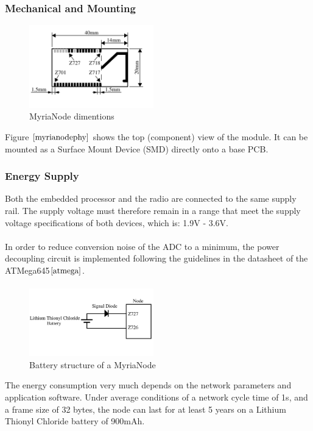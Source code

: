 \documentclass[a4paper,10pt]{report}
\begin{document}
\subsubsection{Mechanical and Mounting}
\begin{figure}
  \begin{center}
    \includegraphics[width=0.48\textwidth]{myrianodephy}
  \end{center}
  \caption{MyriaNode dimentions}
  \label{myrianodephy}
\end{figure}
Figure $\ref{myrianodephy}$ shows the top (component) view of the module. It can be mounted as a Surface Mount Device (SMD) directly onto a base PCB. %
\subsubsection{Energy Supply}
Both the embedded processor and the radio are connected to the same supply rail. The supply voltage must therefore remain in a range that meet the supply voltage specifications of both devices, which is: 1.9V - 3.6V. \paragraph*{}
In order to reduce conversion noise of the ADC to a minimum, the power decoupling circuit is implemented following the guidelines in the datasheet of the ATMega645$\cite{atmega}$. \paragraph*{}
\begin{figure}
  \begin{center}
    \includegraphics[width=0.48\textwidth]{battery}
  \end{center}
  \caption{Battery structure of  a MyriaNode}
  \label{battery}
\end{figure}
The energy consumption very much depends on the network parameters and application software. Under average conditions of a network cycle time of 1s, and a frame size of 32 bytes, the node can last for at least 5 years on a Lithium Thionyl Chloride battery of 900mAh.
\end{document}
